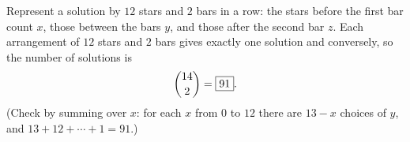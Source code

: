 Represent a solution by $12$ stars and $2$ bars in a row: the stars before the first bar count $x$, those between the bars $y$, and those after the second bar $z$. Each arrangement of $12$ stars and $2$ bars gives exactly one solution and conversely, so the number of solutions is
\[
\dbinom{14}{2}=\boxed{91}.
\]
(Check by summing over $x$: for each $x$ from $0$ to $12$ there are $13-x$ choices of $y$, and $13+12+\cdots+1=91$.)
